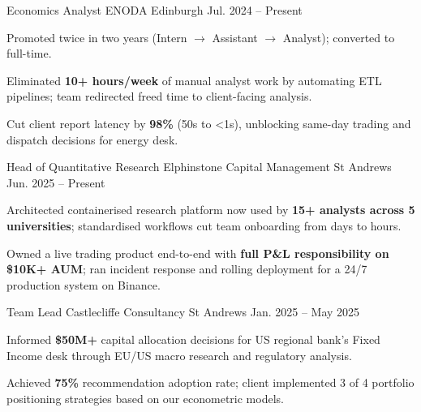

\begin{cventries}

  \cventry
    {Economics Analyst} %
    {ENODA} %
    {Edinburgh} %
    {Jul. 2024 -- Present} %
    {
      \begin{cvitems}
        \item {Promoted twice in two years (Intern $\to$ Assistant $\to$ Analyst); converted to full-time.}
        \item {Eliminated \textbf{10+ hours/week} of manual analyst work by automating ETL pipelines; team redirected freed time to client-facing analysis.}
        \item {Cut client report latency by \textbf{98\%} (50s to <1s), unblocking same-day trading and dispatch decisions for energy desk.}
      \end{cvitems}
    }

  \cventry
    {Head of Quantitative Research} %
    {Elphinstone Capital Management} %
    {St Andrews} %
    {Jun. 2025 -- Present} %
    {
      \begin{cvitems}
        \item {Architected containerised research platform now used by \textbf{15+ analysts across 5 universities}; standardised workflows cut team onboarding from days to hours.}
        \item {Owned a live trading product end-to-end with \textbf{full P\&L responsibility on \$10K+ AUM}; ran incident response and rolling deployment for a 24/7 production system on Binance.}
      \end{cvitems}
    }

  \cventry
    {Team Lead} %
    {Castlecliffe Consultancy} %
    {St Andrews} %
    {Jan. 2025 -- May 2025} %
    {
      \begin{cvitems}
        \item {Informed \textbf{\$50M+} capital allocation decisions for US regional bank's Fixed Income desk through EU/US macro research and regulatory analysis.}
        \item {Achieved \textbf{75\%} recommendation adoption rate; client implemented 3 of 4 portfolio positioning strategies based on our econometric models.}
      \end{cvitems}
    }


\end{cventries}
